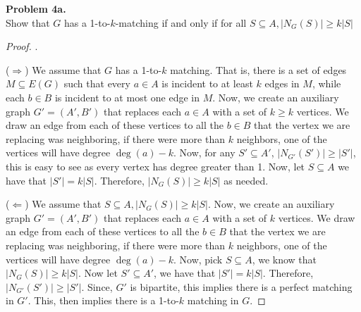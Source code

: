 \documentclass{article}
\newcommand{\size}[1]{|#1|}
\newenvironment{hwproof}[2]
{
    \textbf{Problem #1.}\\
    #2
    \begin{proof}
}{
    \end{proof}
}
\begin{document}
\begin{hwproof}
    {4a}
    {Show that $G$ has a 1-to-$k$-matching if and only if for all $S \subseteq A, \size{N_G(S)} \geq k\size{S}$}.

    ($\Rightarrow$) We assume that $G$ has a 1-to-$k$ matching. That is, there is a set of edges $M \subseteq E(G)$ such that every $a \in A$ is incident to
    at least $k$ edges in $M$, while each $b \in B$ is incident to at most one edge in $M$. Now, we create an auxiliary graph $G' = (A', B')$ that replaces each $a \in A$ with
    a set of $k \geq k$ vertices. We draw an edge from each of these vertices to all the $b\in B$ that the vertex we are replacing was neighboring, if there were more than $k$
    neighbors, one of the vertices will have degree $\deg(a) - k$. Now, for any $S' \subseteq A'$, $\size{N_{G'}(S')} \geq \size{S'}$, this is easy to see as every vertex has
    degree greater than 1. Now, let $S \subseteq A$ we have that $\size{S'} = k\size{S}$.
    Therefore, $\size{N_G(S)} \geq k\size{S}$ as needed.

    ($\Leftarrow$) We assume that $S \subseteq A, \size{N_G(S)} \geq k\size{S}$. Now, we create an auxiliary graph $G' = (A', B')$ that replaces each $a \in A$ with
    a set of $k$ vertices. We draw an edge from each of these vertices to all the $b\in B$ that the vertex we are replacing was neighboring, if there were more than $k$
    neighbors, one of the vertices will have degree $\deg(a) - k$. Now, pick $S \subseteq A$, we know that $\size{N_G(S)} \geq k\size{S}$. Now let $S' \subseteq A'$,
    we have that $\size{S'} = k\size{S}$. Therefore, $\size{N_{G'}(S')} \geq \size{S'}$. Since, $G'$ is bipartite, this implies there is a perfect matching in $G'$.
    This, then implies there is a 1-to-$k$ matching in $G$.
\end{hwproof}
\end{document}
